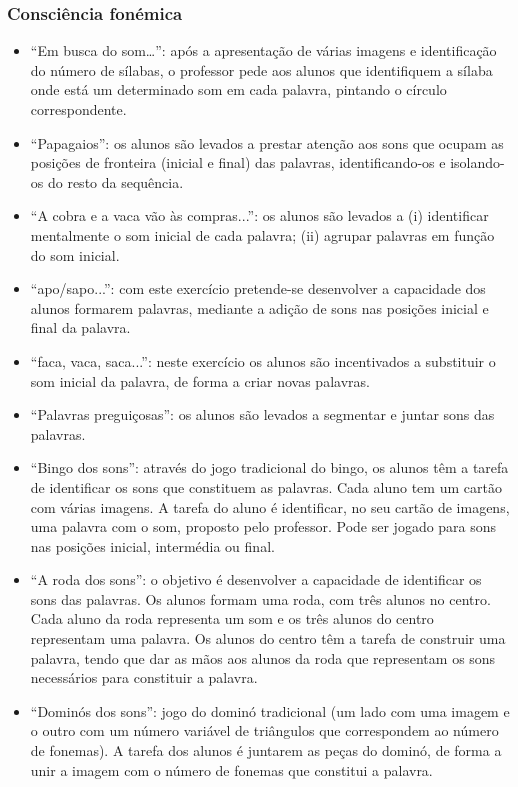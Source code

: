 \documentclass[
  oneside,
  11pt, a4paper,
  footinclude=true,
  headinclude=true,
  cleardoublepage=empty
]{scrbook}
\begin{document}
\subsubsection{Consciência fonémica}
\begin{itemize}
  \item “Em busca do som…”: após a apresentação de várias imagens e identificação do número de sílabas, o professor pede aos alunos que identifiquem a sílaba onde está um determinado som em cada palavra, pintando o círculo correspondente.
  \item “Papagaios”: os alunos são levados a prestar atenção aos sons que ocupam as posições de fronteira (inicial e final) das palavras, identificando-os e isolando-os do resto da sequência.
  \item “A cobra e a vaca vão às compras...”: os alunos são levados a (i) identificar mentalmente o som inicial de cada palavra; (ii) agrupar palavras em função do som inicial.
  \item “apo/sapo...”: com este exercício pretende-se desenvolver a capacidade dos alunos formarem palavras, mediante a adição de sons nas posições inicial e final da palavra.
  \item “faca, vaca, saca...”: neste exercício os alunos são incentivados a substituir o som inicial da palavra, de forma a criar novas palavras.
  \item “Palavras preguiçosas”:  os alunos são levados a segmentar  e juntar  sons das palavras.
  \item “Bingo dos sons”: através do jogo tradicional do bingo, os alunos têm a tarefa de identificar os sons que constituem as palavras. Cada aluno tem um cartão com várias imagens. A tarefa do aluno é identificar, no seu cartão de imagens, uma palavra  com  o som, proposto pelo professor. Pode ser  jogado para sons nas posições inicial, intermédia ou final.
  \item “A roda dos sons”: o objetivo é desenvolver a capacidade de identificar os sons das palavras. Os alunos formam uma roda, com três alunos no centro. Cada aluno da roda representa um som e os três alunos do centro representam uma palavra. Os alunos do centro têm a tarefa de construir uma palavra, tendo que dar as mãos aos alunos da roda que representam os sons necessários para constituir a palavra.
  \item “Dominós dos sons”: jogo do dominó tradicional (um lado com uma imagem e o outro com um número variável de triângulos que correspondem ao número de fonemas). A tarefa dos alunos é juntarem as peças do dominó, de forma a unir a imagem com o número de fonemas que constitui a palavra.
\end{itemize}
\end{document}
